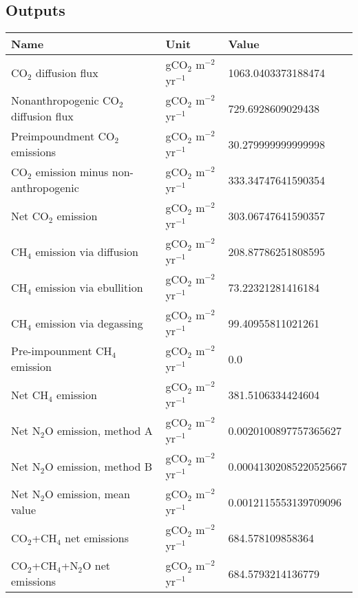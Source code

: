 \documentclass{article}%
\begin{document}
%
\subsection{Outputs}%
\label{subsec:Outputs}%
\begin{center}%
\renewcommand{\arraystretch}{1.0}%
\begin{tabu}{@{}p{10cm} X[c] X[l]@{}}%
\toprule%
\textbf{Name}&\textbf{Unit}&\textbf{Value}\\%
\midrule%
CO$_2$ diffusion flux&gCO$_2$ m$^{-2}$ yr$^{-1}$&\num[round-precision=4,round-mode=figures]{1063.0403373188474}\\%
Nonanthropogenic CO$_2$ diffusion flux&gCO$_2$ m$^{-2}$ yr$^{-1}$&\num[round-precision=4,round-mode=figures]{729.6928609029438}\\%
Preimpoundment CO$_2$ emissions&gCO$_2$ m$^{-2}$ yr$^{-1}$&\num[round-precision=4,round-mode=figures]{30.279999999999998}\\%
CO$_2$ emission minus non-anthropogenic&gCO$_2$ m$^{-2}$ yr$^{-1}$&\num[round-precision=4,round-mode=figures]{333.34747641590354}\\%
Net CO$_2$ emission&gCO$_2$ m$^{-2}$ yr$^{-1}$&\num[round-precision=4,round-mode=figures]{303.06747641590357}\\%
CH$_4$ emission via diffusion&gCO$_2$ m$^{-2}$ yr$^{-1}$&\num[round-precision=4,round-mode=figures]{208.87786251808595}\\%
CH$_4$ emission via ebullition&gCO$_2$ m$^{-2}$ yr$^{-1}$&\num[round-precision=4,round-mode=figures]{73.22321281416184}\\%
CH$_4$ emission via degassing&gCO$_2$ m$^{-2}$ yr$^{-1}$&\num[round-precision=4,round-mode=figures]{99.40955811021261}\\%
Pre-impounment CH$_4$ emission&gCO$_2$ m$^{-2}$ yr$^{-1}$&\num[round-precision=4,round-mode=figures]{0.0}\\%
Net CH$_4$ emission&gCO$_2$ m$^{-2}$ yr$^{-1}$&\num[round-precision=4,round-mode=figures]{381.5106334424604}\\%
Net N$_2$O emission, method A&gCO$_2$ m$^{-2}$ yr$^{-1}$&\num[round-precision=4,round-mode=figures]{0.0020100897757365627}\\%
Net N$_2$O emission, method B&gCO$_2$ m$^{-2}$ yr$^{-1}$&\num[round-precision=4,round-mode=figures]{0.00041302085220525667}\\%
Net N$_2$O emission, mean value&gCO$_2$ m$^{-2}$ yr$^{-1}$&\num[round-precision=4,round-mode=figures]{0.0012115553139709096}\\%
\midrule%
CO$_2$+CH$_4$ net emissions&gCO$_2$ m$^{-2}$ yr$^{-1}$&\num[round-precision=4,round-mode=figures]{684.578109858364}\\%
\midrule%
CO$_2$+CH$_4$+N$_2$O net emissions&gCO$_2$ m$^{-2}$ yr$^{-1}$&\num[round-precision=4,round-mode=figures]{684.5793214136779}\\\bottomrule%
%
\end{tabu}%
\end{center}%
\end{document}
